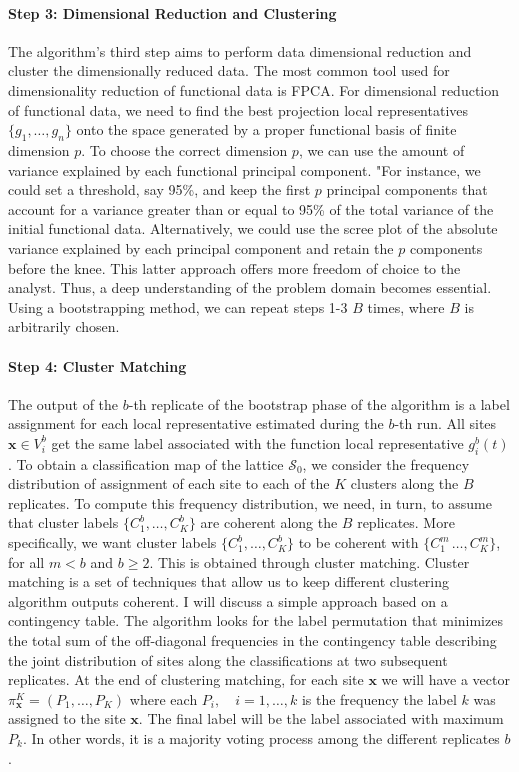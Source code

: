 \paragraph{Step 3: Dimensional Reduction and Clustering} The algorithm's third step aims to perform data dimensional reduction and cluster the dimensionally reduced data. The most common tool used for dimensionality reduction of functional data is FPCA. For dimensional reduction of functional data, we need to find the best projection local representatives $\{g_1, \dots, g_n \}$ onto the space generated by a proper functional basis of finite dimension $p$. To choose the correct dimension $p$, we can use the amount of variance explained by each functional principal component. "For instance, we could set a threshold, say 95\%, and keep the first $p$ principal components that account for a variance greater than or equal to 95\% of the total variance of the initial functional data. Alternatively, we could use the scree plot of the absolute variance explained by each principal component and retain the $p$ components before the knee. This latter approach offers more freedom of choice to the analyst. Thus, a deep understanding of the problem domain becomes essential. Using a bootstrapping method, we can repeat steps 1-3 $B$ times, where $B$ is arbitrarily chosen. 
\paragraph{Step 4: Cluster Matching} The output of the $b$-th replicate of the bootstrap phase of the algorithm is a label assignment for each local representative estimated during the $b$-th run. All sites $\mathbf{x} \in V_i^b$ get the same label associated with the function local representative $g_i^b(t)$. To obtain a classification map of the lattice $\mathcal{S}_0$, we consider the frequency distribution of assignment of each site to each of the $K$ clusters along the $B$ replicates. To compute this frequency distribution, we need, in turn, to assume that cluster labels $\{C_1^b, \dots, C_K^b\}$ are coherent along the $B$ replicates. More specifically, we want cluster labels $\{C_1^b, \dots, C_K^b\}$ to be coherent with $\{C_1^m\, \dots, C_K^m\}$, for all $m<b$ and $b\geq2$. This is obtained through cluster matching. Cluster matching is a set of techniques that allow us to keep different clustering algorithm outputs coherent. I will discuss a simple approach based on a contingency table. The algorithm looks for the label permutation that minimizes the total sum of the off-diagonal frequencies in the contingency table describing the joint distribution of sites along the classifications at two subsequent replicates. At the end of clustering matching, for each site $\mathbf{x}$ we will have a vector $\pi_{\mathbf{x}}^K=\left(P_1, \dots, P_K\right)$ where each $P_i, \quad i=1,\dots,k$ is the frequency the label $k$ was assigned to the site $\mathbf{x}$. The final label will be the label associated with maximum $P_k$. In other words, it is a majority voting process among the different replicates $b$.
